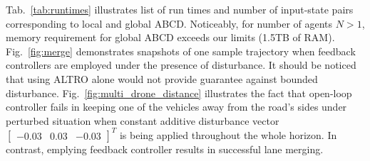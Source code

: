 Tab.~\ref{tab:runtimes} illustrates list of run times and number of input-state pairs corresponding to local and global ABCD. Noticeably, for number of agents $N>1$, memory requirement for global ABCD exceeds our limits (1.5TB of RAM). Fig.~\ref{fig:merge} demonstrates snapshots of one sample trajectory when feedback controllers are employed under the presence of disturbance. It should be noticed that using ALTRO alone would not provide guarantee against bounded disturbance.
Fig.~\ref{fig:multi_drone_distance} illustrates the fact that open-loop controller fails in keeping one of the vehicles away from the road's sides under perturbed situation when constant additive disturbance vector $\begin{bmatrix}-0.03 &0.03&-0.03\end{bmatrix}^T$ is being applied throughout the whole horizon. In contrast, emplying feedback controller results in successful lane merging. %





%



